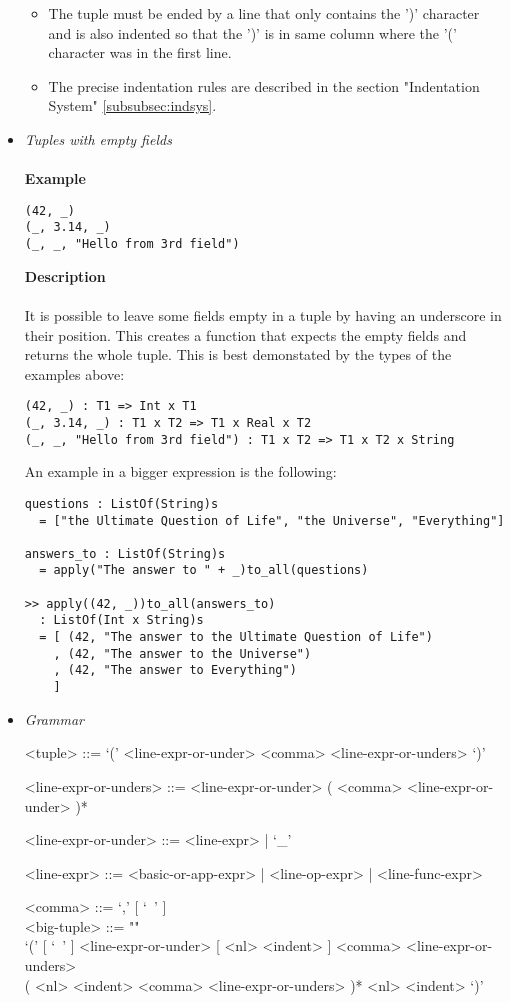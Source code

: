 \documentclass{article}
\begin{document}
\begin{itemize}
\begin{itemize}
\item
The tuple must be ended by a line that only contains the ')' character and is 
also indented so that the ')' is in same column where the '(' character was in
the first line.

\item
The precise indentation rules are described in the section
"Indentation System" \ref{subsubsec:indsys}.
\end{itemize}

\item \textit{Tuples with empty fields}
\\\\
\textbf{Example}
\begin{verbatim}
(42, _)
(_, 3.14, _)
(_, _, "Hello from 3rd field")
\end{verbatim}

\textbf{Description}\\\\
It is possible to leave some fields empty in a tuple by having an underscore in
their position. This creates a function that expects the empty fields
and returns the whole tuple. This is best demonstated by the types of the
examples above:
\begin{verbatim}
(42, _) : T1 => Int x T1
(_, 3.14, _) : T1 x T2 => T1 x Real x T2
(_, _, "Hello from 3rd field") : T1 x T2 => T1 x T2 x String
\end{verbatim}
An example in a bigger expression is the following:
\begin{verbatim}
questions : ListOf(String)s
  = ["the Ultimate Question of Life", "the Universe", "Everything"]

answers_to : ListOf(String)s
  = apply("The answer to " + _)to_all(questions)

>> apply((42, _))to_all(answers_to)
  : ListOf(Int x String)s
  = [ (42, "The answer to the Ultimate Question of Life")
    , (42, "The answer to the Universe")
    , (42, "The answer to Everything")
    ]
\end{verbatim}

\item \textit{Grammar}
\begin{grammar}
<tuple> ::= `(' <line-expr-or-under> <comma> <line-expr-or-unders> `)'

<line-expr-or-unders> ::= <line-expr-or-under> ( <comma> <line-expr-or-under> )*

<line-expr-or-under> ::= <line-expr> | `_'

<line-expr> ::= <basic-or-app-expr> | <line-op-expr> | <line-func-expr>

<comma> ::= `,' [ `\ ' ]
\\

<big-tuple> ::= ""\\
`(' [ `\ ' ] <line-expr-or-under> [ <nl> <indent> ]
<comma> <line-expr-or-unders> \\
( <nl> <indent> <comma> <line-expr-or-unders> )* 
<nl> <indent> `)'
\end{grammar}

\end{itemize}
\end{document}
